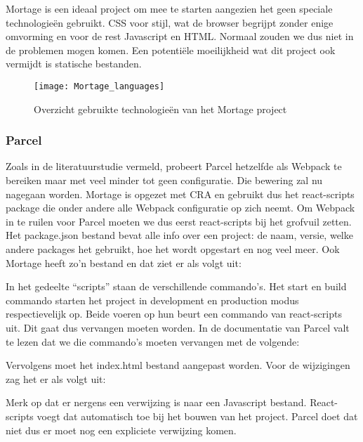 Mortage is een ideaal project om mee te starten aangezien het geen speciale technologieën gebruikt. CSS voor stijl, wat de browser begrijpt zonder enige omvorming en voor de rest Javascript en HTML. Normaal zouden we dus niet in de problemen mogen komen. Een potentiële moeilijkheid wat dit project ook vermijdt is statische bestanden. 

\begin{figure}[h]
    \texttt{[image: Mortage\_languages]}
        \centering
        \caption[]{Overzicht gebruikte technologieën van het Mortage project}
    \end{figure}

\subsubsection{Parcel}
Zoals in de literatuurstudie vermeld, probeert Parcel hetzelfde als Webpack te bereiken maar met veel minder tot geen configuratie. Die bewering zal nu nagegaan worden. Mortage is opgezet met CRA en gebruikt dus het react-scripts package die onder andere alle Webpack configuratie op zich neemt. Om Webpack in te ruilen voor Parcel moeten we dus eerst react-scripts bij het grofvuil zetten. Het package.json bestand bevat alle info over een project: de naam, versie, welke andere packages het gebruikt, hoe het wordt opgestart en nog veel meer. Ook Mortage heeft zo’n bestand en dat ziet er als volgt uit:



In het gedeelte “scripts” staan de verschillende commando’s. Het start en build commando starten het project in development en production modus respectievelijk op. Beide voeren op hun beurt een commando van react-scripts uit. Dit gaat dus vervangen moeten worden. In de documentatie van Parcel valt te lezen dat we die commando’s moeten vervangen met de volgende:



Vervolgens moet het index.html bestand aangepast worden. Voor de wijzigingen zag het er als volgt uit:



Merk op dat er nergens een verwijzing is naar een Javascript bestand. React-scripts voegt dat automatisch toe bij het bouwen van het project. Parcel doet dat niet dus er moet nog een expliciete verwijzing komen. 

